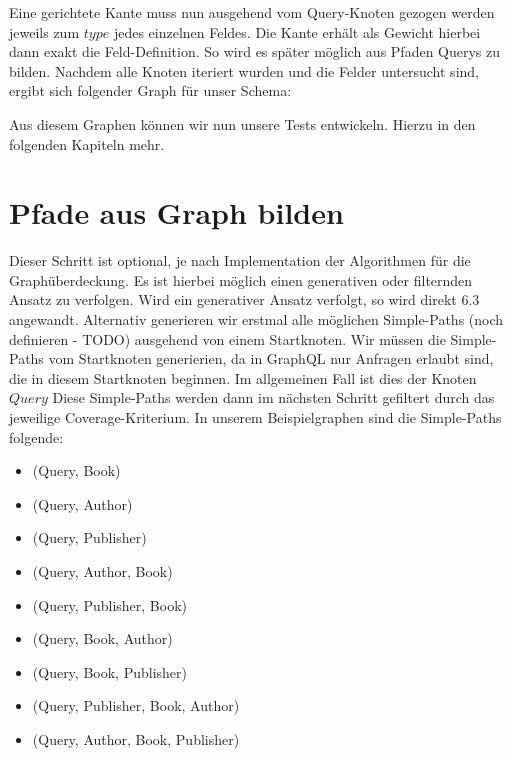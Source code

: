 Eine gerichtete Kante muss nun ausgehend vom Query-Knoten gezogen werden jeweils zum $type$ jedes einzelnen Feldes.
Die Kante erhält als Gewicht hierbei dann exakt die Feld-Definition.
So wird es später möglich aus Pfaden Querys zu bilden.
Nachdem alle Knoten iteriert wurden und die Felder untersucht sind, ergibt sich folgender Graph für unser Schema:


Aus diesem Graphen können wir nun unsere Tests entwickeln.
Hierzu in den folgenden Kapiteln mehr.

\section{Pfade aus Graph bilden}

Dieser Schritt ist optional, je nach Implementation der Algorithmen für die Graphüberdeckung.
Es ist hierbei möglich einen generativen oder filternden Ansatz zu verfolgen.
Wird ein generativer Ansatz verfolgt, so wird direkt $6.3$ angewandt.
Alternativ generieren wir erstmal alle möglichen Simple-Paths (noch definieren - TODO) ausgehend von einem Startknoten.
Wir müssen die Simple-Paths vom Startknoten generierien, da in GraphQL nur Anfragen erlaubt sind, die in diesem Startknoten
beginnen.
Im allgemeinen Fall ist dies der Knoten $Query$
Diese Simple-Paths werden dann im nächsten Schritt gefiltert durch das jeweilige Coverage-Kriterium.
In unserem Beispielgraphen sind die Simple-Paths folgende:

\begin{itemize}
    \item (Query, Book)
    \item (Query, Author)
    \item (Query, Publisher)
    \item (Query, Author, Book)
    \item (Query, Publisher, Book)
    \item (Query, Book, Author)
    \item (Query, Book, Publisher)
    \item (Query, Publisher, Book, Author)
    \item (Query, Author, Book, Publisher)
\end{itemize}

